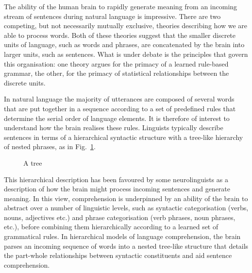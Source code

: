 \documentclass[10pt,letterpaper]{article}
\begin{document}
The ability of the human brain to rapidly generate meaning from an
incoming stream of sentences during natural language is
impressive. There are two competing, but not necessarily mutually
exclusive, theories describing how we are able to process words. Both
of these theories suggest that the smaller discrete units of language,
such as words and phrases, are concatenated by the brain into larger
units, such as sentences. What is under debate is the principles that
govern this organisation: one theory argues for the primacy of a
learned rule-based grammar, the other, for the primacy of statistical
relationships between the discrete units.

%
%

In natural language the majority of utterances are composed of several
words that are put together in a sequence according to a set of
predefined rules that determine the serial order of language
elements. It is therefore of interest to understand how the brain
realises these rules. Linguists typically describe sentences in terms
of a hierarchical syntactic structure with a tree-like hierarchy of
nested phrases, as in Fig.~\ref{fig:tree}.

\begin{figure}[tb]
\begin{center}
\end{center}
\caption{A tree\label{fig:tree}}
\end{figure}


This hierarchical description has been favoured by some neurolinguists
as a description of how the brain might process incoming sentences and
generate meaning. In this view, comprehension is underpinned by an
ability of the brain to abstract over a number of linguistic levels,
such as syntactic categorisation (verbs, nouns, adjectives etc.) and
phrase categorisation (verb phrases, noun phrases, etc.), before
combining them hierarchically according to a learned set of
grammatical rules. In hierarchical models of language comprehension,
the brain parses an incoming sequence of words into a nested
tree-like structure that details the part-whole relationships between
syntactic constituents and aid sentence comprehension.
\end{document}
